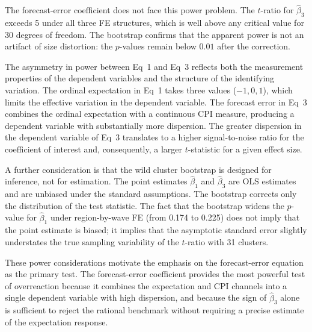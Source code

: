 The forecast-error coefficient does not face this power
problem.
The $t$-ratio for $\hat{\beta}_3$ exceeds 5 under all three
FE structures, which is well above any critical value for
30 degrees of freedom.
The bootstrap confirms that the apparent power is not an
artifact of size distortion: the $p$-values remain below
$0.01$ after the correction.

The asymmetry in power between Eq~1 and Eq~3 reflects both
the measurement properties of the dependent variables and the
structure of the identifying variation.
The ordinal expectation in Eq~1 takes three values
($-1, 0, 1$), which limits the effective variation in the
dependent variable.
The forecast error in Eq~3 combines the ordinal expectation
with a continuous CPI measure, producing a dependent variable
with substantially more dispersion.
The greater dispersion in the dependent variable of Eq~3
translates to a higher signal-to-noise ratio for the
coefficient of interest and, consequently, a larger
$t$-statistic for a given effect size.

A further consideration is that the wild cluster bootstrap
is designed for inference, not for estimation.
The point estimates $\hat{\beta}_1$ and $\hat{\beta}_3$ are
OLS estimates and are unbiased under the standard assumptions.
The bootstrap corrects only the distribution of the test
statistic.
The fact that the bootstrap widens the $p$-value for
$\hat{\beta}_1$ under region-by-wave FE (from 0.174 to 0.225)
does not imply that the point estimate is biased; it implies
that the asymptotic standard error slightly understates the
true sampling variability of the $t$-ratio with 31 clusters.

These power considerations motivate the emphasis on the
forecast-error equation as the primary test.
The forecast-error coefficient provides the most powerful
test of overreaction because it combines the expectation
and CPI channels into a single dependent variable with
high dispersion, and because the sign of $\hat{\beta}_3$
alone is sufficient to reject the rational benchmark without
requiring a precise estimate of the expectation response.
